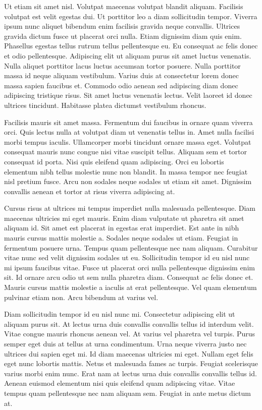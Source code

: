 \documentclass[11pt,a4paper]{article}
\begin{document}
Ut etiam sit amet nisl. Volutpat maecenas volutpat blandit aliquam. Facilisis volutpat est velit egestas dui. Ut porttitor leo a diam sollicitudin tempor. Viverra ipsum nunc aliquet bibendum enim facilisis gravida neque convallis. Ultrices gravida dictum fusce ut placerat orci nulla. Etiam dignissim diam quis enim. Phasellus egestas tellus rutrum tellus pellentesque eu. Eu consequat ac felis donec et odio pellentesque. Adipiscing elit ut aliquam purus sit amet luctus venenatis. Nulla aliquet porttitor lacus luctus accumsan tortor posuere. Nulla porttitor massa id neque aliquam vestibulum. Varius duis at consectetur lorem donec massa sapien faucibus et. Commodo odio aenean sed adipiscing diam donec adipiscing tristique risus. Sit amet luctus venenatis lectus. Velit laoreet id donec ultrices tincidunt. Habitasse platea dictumst vestibulum rhoncus.

Facilisis mauris sit amet massa. Fermentum dui faucibus in ornare quam viverra orci. Quis lectus nulla at volutpat diam ut venenatis tellus in. Amet nulla facilisi morbi tempus iaculis. Ullamcorper morbi tincidunt ornare massa eget. Volutpat consequat mauris nunc congue nisi vitae suscipit tellus. Aliquam sem et tortor consequat id porta. Nisi quis eleifend quam adipiscing. Orci eu lobortis elementum nibh tellus molestie nunc non blandit. In massa tempor nec feugiat nisl pretium fusce. Arcu non sodales neque sodales ut etiam sit amet. Dignissim convallis aenean et tortor at risus viverra adipiscing at.

Cursus risus at ultrices mi tempus imperdiet nulla malesuada pellentesque. Diam maecenas ultricies mi eget mauris. Enim diam vulputate ut pharetra sit amet aliquam id. Sit amet est placerat in egestas erat imperdiet. Est ante in nibh mauris cursus mattis molestie a. Sodales neque sodales ut etiam. Feugiat in fermentum posuere urna. Tempus quam pellentesque nec nam aliquam. Curabitur vitae nunc sed velit dignissim sodales ut eu. Sollicitudin tempor id eu nisl nunc mi ipsum faucibus vitae. Fusce ut placerat orci nulla pellentesque dignissim enim sit. Id ornare arcu odio ut sem nulla pharetra diam. Consequat ac felis donec et. Mauris cursus mattis molestie a iaculis at erat pellentesque. Vel quam elementum pulvinar etiam non. Arcu bibendum at varius vel.

Diam sollicitudin tempor id eu nisl nunc mi. Consectetur adipiscing elit ut aliquam purus sit. At lectus urna duis convallis convallis tellus id interdum velit. Vitae congue mauris rhoncus aenean vel. At varius vel pharetra vel turpis. Purus semper eget duis at tellus at urna condimentum. Urna neque viverra justo nec ultrices dui sapien eget mi. Id diam maecenas ultricies mi eget. Nullam eget felis eget nunc lobortis mattis. Netus et malesuada fames ac turpis. Feugiat scelerisque varius morbi enim nunc. Erat nam at lectus urna duis convallis convallis tellus id. Aenean euismod elementum nisi quis eleifend quam adipiscing vitae. Vitae tempus quam pellentesque nec nam aliquam sem. Feugiat in ante metus dictum at.
\end{document}
